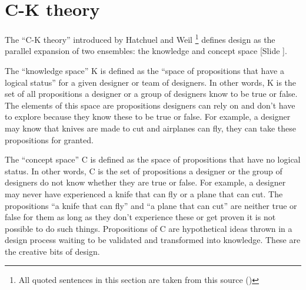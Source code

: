 \documentclass{article}
\newcounter{slide}
\begin{document}
\section{C-K theory}
\label{sec:CK}
The ``C-K theory'' introduced by Hatchuel and Weil \cite{hatchuel2003new}\footnote{All quoted sentences in this section are taken from this source (\cite{hatchuel2003new})} defines design as the parallel expansion of two ensembles: the knowledge and concept space {\color{blue}[Slide ]}. 

The ``knowledge space'' K is defined as the ``space of propositions that have a logical status'' for a given designer or team of designers. In other words, K is the set of all propositions a designer or a group of designers know to be true or false. The elements of this space are propositions designers can rely on and don't have to explore because they know these to be true or false. For example, a designer may know that knives are made to cut and airplanes can fly, they can take these propositions for granted. 

The ``concept space'' C is defined as the space of propositions that have no logical status. In other words, C is the set of propositions a designer or the group of designers do not know whether they are true or false. For example, a designer may never have experienced a knife that can fly or a plane that can cut. The propositions ``a knife that can fly'' and ``a plane that can cut'' are neither true or false for them as long as they don't experience these or get proven it is not possible to do such things. Propositions of C are hypothetical ideas thrown in a design process waiting to be validated and transformed into knowledge. These are the creative bits of design. 
\end{document}
